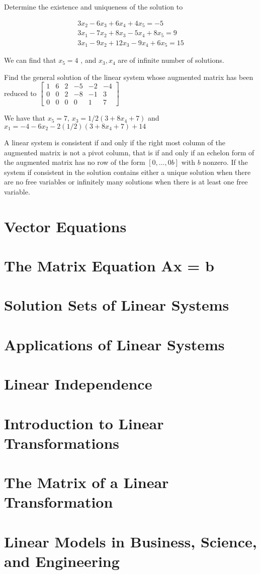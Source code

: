\documentclass[../linalg.tex]{subfiles}
\begin{document}
\begin{example}
    Determine the existence and uniqueness of the solution to 

    \begin{align*}
    3x_2-6x_3+6x_4+4x_5=-5\\ 
    3x_1-7x_2+8x_3-5x_4+8x_5 = 9\\
    3x_1-9x_2+12x_3-9x_4+6x_5=15
    \end{align*}

    We can find that $x_5=4$ , and $x_3,x_4$ are of infinite number of solutions. 
\end{example}

\begin{example}
    Find the general solution of the linear system whose augmented matrix has been reduced to 
    $\begin{bmatrix}
        1 & 6 & 2 & -5 & -2 & -4 \\
        0 & 0 & 2 & -8 & -1 & 3 \\
        0 & 0 & 0 & 0& 1 & 7
    \end{bmatrix}$

    We have that $x_5=7$, $x_3=1/2(3+8x_4+7)$ and $x_1=-4-6x_2-2(1/2)(3+8x_4+7)+14$
\end{example}

\begin{theorem}
    A linear system is consistent if and only if the right most column of the augmented matrix is not a pivot column, that is if and only if an echelon form of the augmented matrix 
    has no row of the form $[0,\dots, 0 b]$ with $b$ nonzero. If the system if consistent in the solution contains either a unique solution when there are no free variables or infinitely many solutions when there is at least one free variable.
\end{theorem}

\section{Vector Equations}
\section{The Matrix Equation Ax = b}
\section{Solution Sets of Linear Systems}
\section{Applications of Linear Systems}
\section{Linear Independence}
\section{Introduction to Linear Transformations}
\section{The Matrix of a Linear Transformation}
\section{Linear Models in Business, Science, and Engineering}
\end{document}
